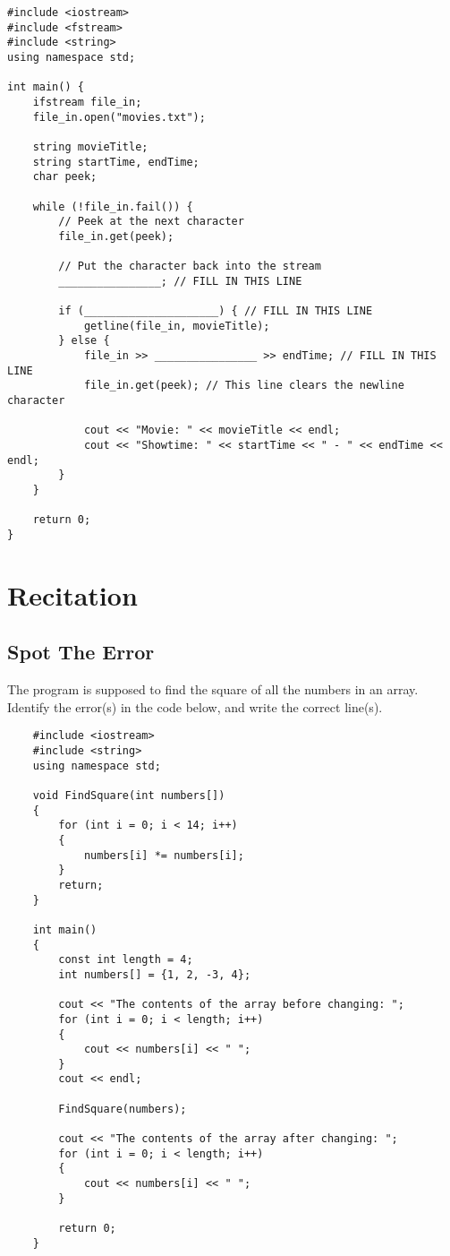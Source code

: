 \begin{verbatim}
#include <iostream>
#include <fstream>
#include <string>
using namespace std;

int main() {
    ifstream file_in;
    file_in.open("movies.txt");

    string movieTitle;
    string startTime, endTime;
    char peek;

    while (!file_in.fail()) {
        // Peek at the next character
        file_in.get(peek);

        // Put the character back into the stream
        ________________; // FILL IN THIS LINE

        if (_____________________) { // FILL IN THIS LINE
            getline(file_in, movieTitle);
        } else {
            file_in >> ________________ >> endTime; // FILL IN THIS LINE
            file_in.get(peek); // This line clears the newline character

            cout << "Movie: " << movieTitle << endl;
            cout << "Showtime: " << startTime << " - " << endTime << endl;
        }
    }

    return 0;
}
\end{verbatim}

\section{Recitation}

\subsection{Spot The Error}
\begin{multipart}
The program is supposed to find the square of all the numbers in an array. Identify the error(s) in the code below, and write the correct line(s).
\end{multipart}

\begin{verbatim}
    #include <iostream>
    #include <string>
    using namespace std;
    
    void FindSquare(int numbers[]) 
    {
        for (int i = 0; i < 14; i++) 
        {
            numbers[i] *= numbers[i];
        }
        return;
    }
    
    int main()
    {
        const int length = 4;
        int numbers[] = {1, 2, -3, 4};
    
        cout << "The contents of the array before changing: ";
        for (int i = 0; i < length; i++)
        {
            cout << numbers[i] << " ";
        }
        cout << endl;
    
        FindSquare(numbers);
    
        cout << "The contents of the array after changing: ";
        for (int i = 0; i < length; i++)
        {
            cout << numbers[i] << " ";
        }
    
        return 0;
    }
\end{verbatim}

